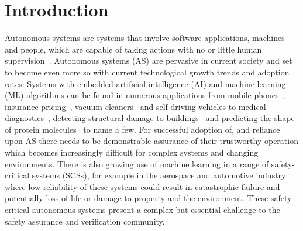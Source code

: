% 


\section{Introduction}\label{sec:intro}

Autonomous systems are systems that involve software applications, machines and people, which are capable of taking actions with no or little human supervision~\cite{Murukannaiah2020}.
%
Autonomous systems (AS) are pervasive in current society and set to become even more so with current technological growth trends and adoption rates. Systems with embedded artificial intelligence (AI) and machine learning (ML) algorithms can be found in numerous applications from mobile phones~\cite{mediumaiphones}, insurance pricing~\cite{kuo2020towards}, vacuum cleaners~\cite{tf_vacuum} and self-driving vehicles to medical diagnostics~\cite{kononenko2001machine}, detecting structural damage to buildings~\cite{avci2021review} and predicting the shape of protein molecules~\cite{alpha_fold} to name a few.
%
For successful adoption of, and reliance upon AS there needs to be demonstrable assurance of their trustworthy operation which becomes increasingly difficult for complex systems and changing environments.  
%
There is also growing use of machine learning in a range of safety-critical systems (SCSs), for example in the aerospace and automotive industry where low reliability of these systems could result in catastrophic failure and potentially loss of life or damage to property and the environment. These safety-critical autonomous systems present a complex but essential challenge to the safety assurance and verification community. 

